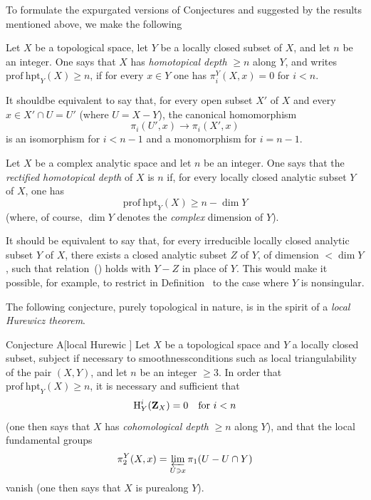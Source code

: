 To formulate the expurgated versions of Conjectures  and  suggested by the results mentioned above, we make the following

\begin{supdefinition} \label{XIII.6.1}
Let $X$ be a topological space, let $Y$ be a locally closed subset of $X$, and let $n$ be an integer. One says that $X$ has \emph{homotopical depth} $\geq n$ along $Y$, and writes $\mathrm{prof\:hpt}_Y(X)\geq n$, if for every $x\in Y$ one has $\pi_i^Y(X,x)=0$ for $i<n$.
\end{supdefinition}

It should\pageoriginale be equivalent to say that, for every open subset $X'$ of $X$ and every $x\in X'\cap U=U'$ (where $U=X-Y$), the canonical homomorphism
$$
\pi_i(U',x)\to\pi_i(X',x)
$$
is an isomorphism for $i<n-1$ and a monomorphism for $i=n-1$.

\begin{supdefinition} \label{XIII.6.2}
Let $X$ be a complex analytic space and let $n$ be an integer. One says that the \emph{rectified homotopical depth} of $X$ is $n$ if, for every locally closed analytic subset $Y$ of $X$, one has
\begin{equation*} \label{eq:XIII.6.x} \tag{$x$} {\mathrm{prof\:hpt}_Y(X)\geq n-\dim Y}
\end{equation*}
(where, of course, $\dim Y$ denotes the \emph{complex} dimension of $Y$).
\end{supdefinition}

It should be equivalent to say that, for every irreducible locally closed analytic subset $Y$ of $X$, there exists a closed analytic subset $Z$ of $Y$, of dimension $<\dim Y$, such that relation~() holds with $Y-Z$ in place of $Y$. This would make it possible, for example, to restrict in Definition~ to the case where $Y$ is nonsingular.

\enlargethispage{\baselineskip}%
The following conjecture, purely topological in nature, is in the spirit of a \og \emph{local Hurewicz theorem}\fg.

 \label{XIII.6.A}
\begin{enonce*}{Conjecture A}[\og local Hurewic \fg]
Let $X$ be a topological space and $Y$ a locally closed subset, subject if necessary to \og smoothness\fg conditions such as local triangulability of the pair $(X,Y)$, and let $n$ be an integer $\geq 3$. In order that $\mathrm{prof\:hpt}_Y(X)\geq n$, it is necessary and sufficient that\pageoriginale
$$
\H^i_Y(\ZZ_X)=0\quad\text{for }i<n
$$
(one then says that $X$ has \emph{cohomological depth} $\geq n$ along $Y$), and that the local fundamental groups
$$
\sisi{\pi^2_Y}{\pi_2^Y}(X,x)=\varprojlim_{U\ni x}\pi_1(U-U\cap Y)
$$
vanish (one then says that $X$ is \og pure\fg along $Y$).
\end{enonce*}


